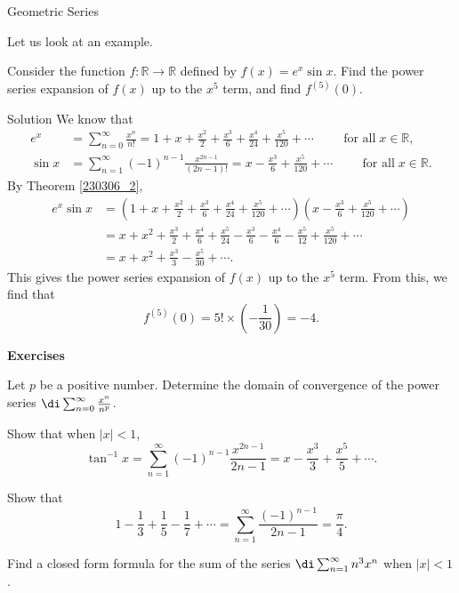 \begin{example}[label=230305_16]{Geometric Series}
\begin{example}[label=230304_9]{}
\begin{example}{}
Let us look at an example.
\begin{example}{}
Consider the function $f:\mathbb{R}\to\mathbb{R}$ defined by $f(x)=e^x\sin x$. Find  the power series expansion of $f(x)$ up to the $x^5$ term, and find $f^{(5)}(0)$. 
\end{example}
\begin{solution}{Solution} 
We know that \begin{align*}
e^x&=\sum_{n=0}^{\infty}\frac{x^n}{n!}=1+x+\frac{x^2}{2}+\frac{x^3}{6}+\frac{x^4}{24}+\frac{x^5}{120}+\cdots\hspace{1cm}\text{for all}\;x\in\mathbb{R},\\
 \sin x&=\sum_{n=1}^{\infty}(-1)^{n-1}\frac{x^{2n-1}}{(2n-1)!}=x-\frac{x^3}{6}+\frac{x^5}{120}+\cdots\hspace{1cm}\text{for all}\;x\in\mathbb{R}.\end{align*}
By Theorem \ref{230306_2},
\begin{align*}
e^x\sin x&=\left(1+x+\frac{x^2}{2}+\frac{x^3}{6}+\frac{x^4}{24}+\frac{x^5}{120}+\cdots\right)\left(x-\frac{x^3}{6} +\frac{x^5}{120}+\cdots\right)\\
&=x+x^2+\frac{x^3}{2}+\frac{x^4}{6}+\frac{x^5}{24}-\frac{x^3}{6}-\frac{x^4}{6}-\frac{x^5}{12}+\frac{x^5}{120}+\cdots\\
&=x+x^2+\frac{x^3}{3}-\frac{x^5}{30}+\cdots.
\end{align*}This gives the power series expansion of $f(x)$ up to the  $x^5$ term.  From this, we find that
\[f^{(5)}(0)=5!\times\left(-\frac{1}{30}\right)=-4.\]
\end{solution}
\vp
\noindent
{\bf \large Exercises  \thesection}
\setcounter{myquestion}{1}
\begin{question}{\themyquestion}
Let $p$ be a positive number. Determine the  domain of convergence of the power series $\di \sum_{n=0}^{\infty}\frac{x^n}{n^p}$.
\end{question}
\atc
 \begin{question}{\themyquestion}Show that when $|x|<1$,
\[\tan^{-1}x=\sum_{n=1}^{\infty}(-1)^{n-1}\frac{x^{2n-1}}{2n-1}=x-\frac{x^3}{3}+\frac{x^5}{5}+\cdots.\]
\end{question}
\atc
\begin{question}{ \themyquestion{}}
Show that 
\[1-\frac{1}{3}+\frac{1}{5}-\frac{1}{7}+\cdots=\sum_{n=1}^{\infty}\frac{ (-1)^{n-1}}{2n-1}=\frac{\pi}{4}.\]
\end{question}
\atc
\begin{question}{\themyquestion}
Find a closed form formula for the sum of the series
$\di \sum_{n=1}^{\infty}n^3x^n$ when $|x|<1$.
\end{question}


\end{example}
\end{example}
\end{example}

